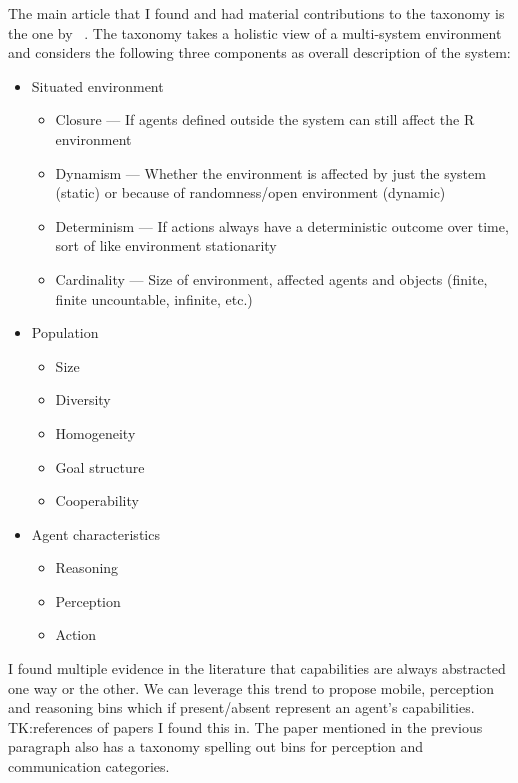 \documentclass[letterpaper, 10 pt, conference]{ieeeconf} %
\theoremstyle{definition} \newtheorem{definition}{Definition}
\newcommand{\citet}[1]{\citeauthor{#1}~\cite{#1}}
\begin{document}
The main article that I found and had material contributions to the taxonomy is
the one by \citet{moya2007towards}. The taxonomy takes a holistic view of a
multi-system environment and considers the following three components as overall
description of the system:
\begin{itemize}{}
  \item Situated environment
        \begin{itemize}{}
          \item Closure --- If agents defined outside the system can still affect
                the R environment
          \item Dynamism --- Whether the environment is affected by just the system
                (static) or because of randomness/open environment (dynamic)
          \item Determinism --- If actions always have a deterministic outcome over
                time, sort of like environment stationarity
          \item Cardinality --- Size of environment, affected agents and objects
                (finite, finite uncountable, infinite, etc.)
        \end{itemize}
  \item Population
        \begin{itemize}{}
          \item Size
          \item Diversity
          \item Homogeneity
          \item Goal structure
          \item Cooperability
        \end{itemize}
  \item Agent characteristics
        \begin{itemize}{}
          \item Reasoning
          \item Perception
          \item Action
        \end{itemize}
\end{itemize}

I found multiple evidence in the literature that capabilities are always
abstracted one way or the other. We can leverage this trend to propose mobile,
perception and reasoning bins which if present/absent represent an agent's
capabilities. TK:\@ references of papers I found this in. The paper mentioned in
the previous paragraph also has a taxonomy spelling out bins for perception and
communication categories.
\end{document}
